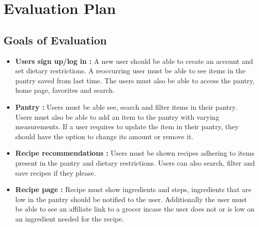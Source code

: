 \documentclass[manuscript, screen, nonacm]{acmart}
\begin{document}
\author{Aamna Niaz}

\author{Ahmad Ghachim}

\author{Aitazaz Gilani}

\author{Minh Nguyen}

\author{Sina Khademolhosseini}

\newpage
\setcounter{page}{1}
\section{Evaluation Plan}

\subsection{Goals of Evaluation}
\begin{itemize}
    \item    \textbf{Users sign up/log in :}  A new user should be able to create an account and set dietary restrictions. A reoccurring user must be able to see items in the pantry saved from last time. The users must also be able to access the pantry, home page, favorites and search.
    \item  \textbf{Pantry :} Users must be able see, search and filter items in their pantry. Users must also be able to add an item to the pantry with varying measurements.  If a user requires to update the item in their pantry, they should have the option to change its amount or remove it.
    \item \textbf{Recipe recommendations :} Users must be shown recipes adhering to items present in the pantry and dietary restrictions. Users can also search, filter and save recipes if they please.
    \item \textbf{Recipe page :} Recipe must show ingredients and steps, ingredients that are low in the pantry should be notified to the user. Additionally the user must be able to see an affiliate link to a grocer incase the user does not or is low on an ingredient needed for the recipe.
    
\end{itemize}
\end{document}
